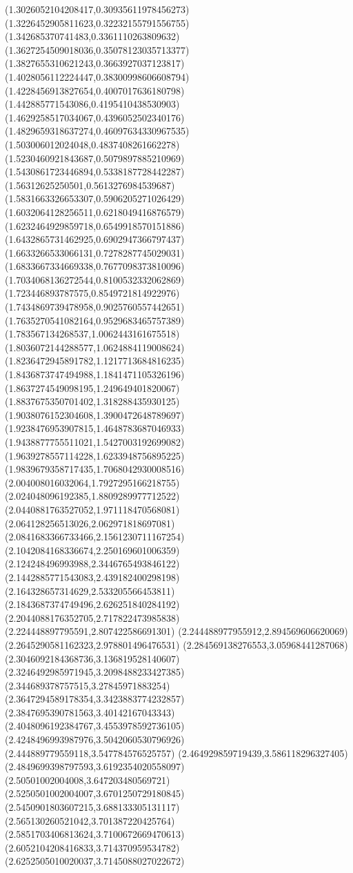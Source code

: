 {(1.3026052104208417,0.30935611978456273)
(1.3226452905811623,0.32232155791556755)
(1.342685370741483,0.3361110263809632)
(1.3627254509018036,0.35078123035713377)
(1.3827655310621243,0.3663927037123817)
(1.4028056112224447,0.38300998606608794)
(1.4228456913827654,0.4007017636180798)
(1.442885771543086,0.4195410438530903)
(1.4629258517034067,0.4396052502340176)
(1.4829659318637274,0.46097634330967535)
(1.503006012024048,0.4837408261662278)
(1.5230460921843687,0.5079897885210969)
(1.5430861723446894,0.5338187728442287)
(1.56312625250501,0.5613276984539687)
(1.5831663326653307,0.5906205271026429)
(1.6032064128256511,0.6218049416876579)
(1.6232464929859718,0.6549918570151886)
(1.6432865731462925,0.6902947366797437)
(1.6633266533066131,0.7278287745029031)
(1.6833667334669338,0.7677098373810096)
(1.7034068136272544,0.8100532332062869)
(1.723446893787575,0.8549721814922976)
(1.7434869739478958,0.9025760557442651)
(1.7635270541082164,0.9529683465757389)
(1.783567134268537,1.0062443161675518)
(1.8036072144288577,1.0624884119008624)
(1.8236472945891782,1.1217713684816235)
(1.8436873747494988,1.1841471105326196)
(1.8637274549098195,1.249649401820067)
(1.8837675350701402,1.318288435930125)
(1.9038076152304608,1.3900472648789697)
(1.9238476953907815,1.4648783687046933)
(1.9438877755511021,1.5427003192699082)
(1.9639278557114228,1.6233948756895225)
(1.9839679358717435,1.7068042930008516)
(2.004008016032064,1.7927295166218755)
(2.024048096192385,1.8809289977712522)
(2.0440881763527052,1.971118470568081)
(2.064128256513026,2.062971818697081)
(2.0841683366733466,2.1561230711167254)
(2.1042084168336674,2.250169601006359)
(2.124248496993988,2.3446765493846122)
(2.1442885771543083,2.439182400298198)
(2.164328657314629,2.533205566453811)
(2.1843687374749496,2.626251840284192)
(2.2044088176352705,2.717822473985838)
(2.224448897795591,2.807422586691301)
(2.244488977955912,2.894569606620069)
(2.2645290581162323,2.978801496476531)
(2.284569138276553,3.05968441287068)
(2.3046092184368736,3.136819528140607)
(2.3246492985971945,3.2098488233427385)
(2.344689378757515,3.27845971883254)
(2.3647294589178354,3.3423883774232857)
(2.3847695390781563,3.40142167043343)
(2.4048096192384767,3.4553978592736105)
(2.4248496993987976,3.5042060530796926)
(2.444889779559118,3.547784576525757)
(2.464929859719439,3.586118296327405)
(2.4849699398797593,3.6192354020558097)
(2.50501002004008,3.647203480569721)
(2.5250501002004007,3.6701250729180845)
(2.5450901803607215,3.688133305131117)
(2.565130260521042,3.701387220425764)
(2.5851703406813624,3.7100672669470613)
(2.6052104208416833,3.714370959534782)
(2.6252505010020037,3.7145088027022672)
}
